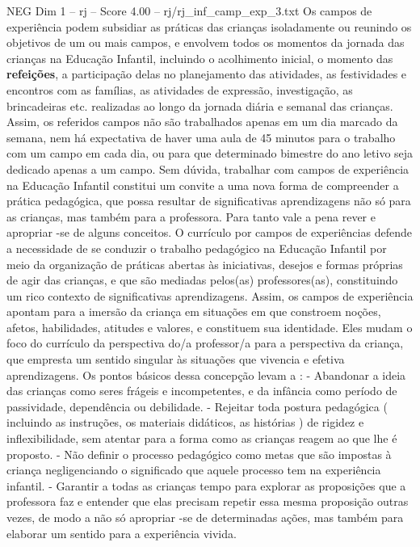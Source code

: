 \begin{textsample}{NEG Dim 1 – rj – Score 4.00 – rj/rj\_inf\_camp\_exp\_3.txt}  \label{ex:f1_neg_009}
Os campos de experiência podem subsidiar as práticas das crianças isoladamente ou reunindo os objetivos de um ou mais campos, e envolvem todos os momentos da jornada das crianças na Educação Infantil, incluindo o acolhimento inicial, o momento das \textbf{refeições}, a participação delas no planejamento das atividades, as festividades e encontros com as famílias, as atividades de expressão, investigação, as brincadeiras etc. realizadas ao longo da jornada diária e semanal das crianças.
Assim, os referidos campos não são trabalhados apenas em um dia marcado da semana, nem há expectativa de haver uma aula de 45 minutos para o trabalho com um campo em cada dia, ou para que determinado bimestre do ano letivo seja dedicado apenas a um campo.
Sem dúvida, trabalhar com campos de experiência na Educação Infantil constitui um convite a uma nova forma de compreender a prática pedagógica, que possa resultar de significativas aprendizagens não só para as crianças, mas também para a professora.
Para tanto vale a pena rever e apropriar -se de alguns conceitos.
O currículo por campos de experiências defende a necessidade de se conduzir o trabalho pedagógico na Educação Infantil por meio da organização de práticas abertas às iniciativas, desejos e formas próprias de agir das crianças, e que são mediadas pelos(as) professores(as), constituindo um rico contexto de significativas aprendizagens.
Assim, os campos de experiência apontam para a imersão da criança em situações em que constroem noções, afetos, habilidades, atitudes e valores, e constituem sua identidade.
Eles mudam o foco do currículo da perspectiva do/a professor/a para a perspectiva da criança, que empresta um sentido singular às situações que vivencia e efetiva aprendizagens.
Os pontos básicos dessa concepção levam a : - Abandonar a ideia das crianças como seres frágeis e incompetentes, e da infância como período de passividade, dependência ou debilidade. - Rejeitar toda postura pedagógica ( incluindo as instruções, os materiais didáticos, as histórias ) de rigidez e inflexibilidade, sem atentar para a forma como as crianças reagem ao que lhe é proposto. - Não definir o processo pedagógico como metas que são impostas à criança negligenciando o significado que aquele processo tem na experiência infantil. - Garantir a todas as crianças tempo para explorar as proposições que a professora faz e entender que elas precisam repetir essa mesma proposição outras vezes, de modo a não só apropriar -se de determinadas ações, mas também para elaborar um sentido para a experiência vivida.

\end{textsample}

